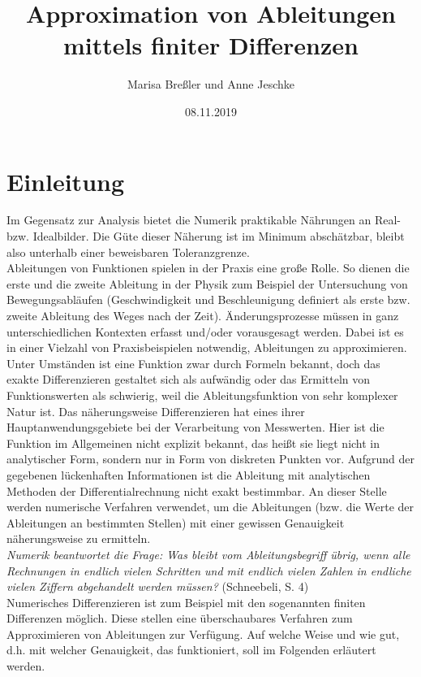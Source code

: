 \documentclass{scrartcl}
\begin{document}
\title{Approximation von Ableitungen\\mittels finiter Differenzen}
\author{Marisa Breßler und Anne Jeschke}
\date{08.11.2019}
\maketitle
\tableofcontents
\pagebreak \section{Einleitung}
\label{sec:einleitung}
Im Gegensatz zur Analysis bietet die Numerik praktikable Nährungen an Real- bzw. Idealbilder. Die Güte dieser Näherung ist im Minimum abschätzbar, bleibt also unterhalb einer beweisbaren Toleranzgrenze. \\
Ableitungen von Funktionen spielen in der Praxis eine große Rolle. So dienen die erste und die zweite Ableitung in der Physik zum Beispiel der Untersuchung von Bewegungsabläufen (Geschwindigkeit und Beschleunigung definiert als erste bzw. zweite Ableitung des Weges nach der Zeit). Änderungsprozesse müssen in ganz unterschiedlichen Kontexten erfasst und/oder vorausgesagt werden. Dabei ist es in einer Vielzahl von Praxisbeispielen notwendig, Ableitungen zu approximieren. Unter Umständen ist eine Funktion zwar durch Formeln bekannt, doch das exakte Differenzieren gestaltet sich als aufwändig oder das Ermitteln von Funktionswerten als schwierig, weil die Ableitungsfunktion von sehr komplexer Natur ist. Das näherungsweise Differenzieren hat eines ihrer Hauptanwendungsgebiete bei der Verarbeitung von Messwerten. Hier ist die Funktion im Allgemeinen nicht explizit bekannt, das heißt sie liegt nicht in analytischer Form, sondern nur in Form von diskreten Punkten vor. Aufgrund der gegebenen lückenhaften Informationen ist die Ableitung mit analytischen Methoden der Differentialrechnung nicht exakt bestimmbar. An dieser Stelle werden numerische Verfahren verwendet, um die Ableitungen (bzw. die Werte der Ableitungen an bestimmten Stellen) mit einer gewissen Genauigkeit näherungsweise zu ermitteln. \\
\linebreak 
\textit{Numerik beantwortet die Frage: Was bleibt vom Ableitungsbegriff übrig, wenn alle Rechnungen in endlich vielen Schritten und mit endlich vielen Zahlen in endliche vielen Ziffern abgehandelt werden müssen?} (Schneebeli, S. 4)\\
\linebreak 
Numerisches Differenzieren ist zum Beispiel mit den sogenannten finiten Differenzen möglich. Diese stellen eine überschaubares Verfahren zum Approximieren von Ableitungen zur Verfügung. Auf welche Weise und wie gut, d.h. mit welcher Genauigkeit, das funktioniert, soll im Folgenden erläutert werden. \\
\end{document}
